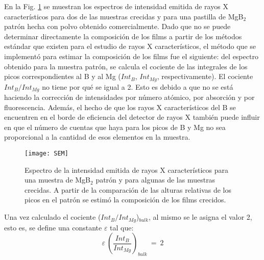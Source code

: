 En la Fig. \ref{fig:SEM} se muestran los espectros de intensidad emitida de rayos X característicos para dos de las muestras crecidas y para una pastilla de MgB$_{2}$ patrón hecha con polvo obtenido comercialmente. Dado que no se puede determinar directamente la composición de los films a partir de los métodos estándar que existen para el estudio de rayos X característicos, el método que se implementó para estimar la composición de los films fue el siguiente: del espectro obtenido para la muestra patrón, se calcula el cociente de las integrales de los picos correspondientes al B y al Mg ($Int_{B}$, $Int_{Mg}$, respectivamente). El cociente $Int_{B}/Int_{Mg}$ no tiene por qué se igual a 2. Esto es debido a que no se está haciendo la corrección de intensidades por número atómico, por absorción y por fluorescencia. Además, el hecho de que los rayos X característicos del B se encuentren en el borde de eficiencia del detector de rayos X también puede influir en que el número de cuentas que haya para los picos de B y Mg no sea proporcional a la cantidad de esos elementos en la muestra.
\begin{figure}[tbh!]
 \begin{center}
    \texttt{[image: SEM]}
  \end{center}
  \caption[Espectro de la intensidad emitida de rayos X característicos para una muestra de MgB$_{2}$ patrón y para algunas de las muestras crecidas.]{Espectro de la intensidad emitida de rayos X característicos para una muestra de MgB$_{2}$ patrón y para algunas de las muestras crecidas. A partir de la comparación de las alturas relativas de los picos en el patrón se estimó la composición de los films crecidos.}
\label{fig:SEM}
\end{figure}

Una vez calculado el cociente ($Int_{B}/Int_{Mg}$)$_{bulk}$, al mismo se le asigna el valor 2, esto es, se define una constante $\varepsilon$ tal que:
\begin{equation}
  \varepsilon \ \left(\frac{Int_{B}}{Int_{Mg}}\right)_{bulk} \ = \ 2
  \label{eq:patron}
\end{equation}


